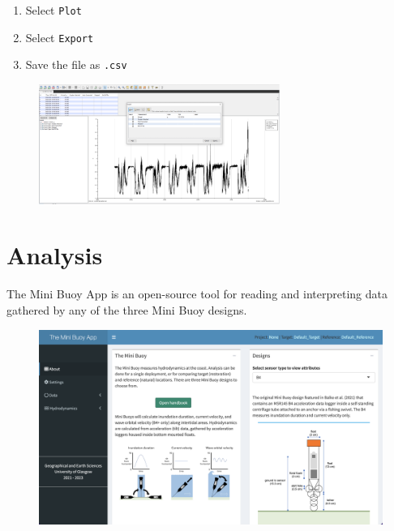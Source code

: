 \documentclass[
  letterpaper,
  DIV=11,
  numbers=noendperiod]{scrreprt}
\providecommand{\tightlist}{%
  \setlength{\itemsep}{0pt}\setlength{\parskip}{0pt}}\usepackage{longtable,booktabs,array}
\begin{document}
\begin{enumerate}
\def\labelenumi{\arabic{enumi}.}
\setcounter{enumi}{6}
\tightlist
\item
  Select \texttt{Plot}
\item
  Select \texttt{Export}
\item
  Save the file as \texttt{.csv}
\end{enumerate}

\begin{figure}

{\centering \includegraphics[width=0.7\textwidth,height=\textheight]{chapters/figs/HOBOExportStep4.png}

}

\end{figure}


\hypertarget{analysis}{%
\chapter{Analysis}\label{analysis}}

The Mini Buoy App is an open-source tool for reading and interpreting
data gathered by any of the three Mini Buoy designs.

\begin{figure}

{\centering \includegraphics[width=1\textwidth,height=\textheight]{chapters/figs/About.png}

}

\end{figure}
\end{document}
